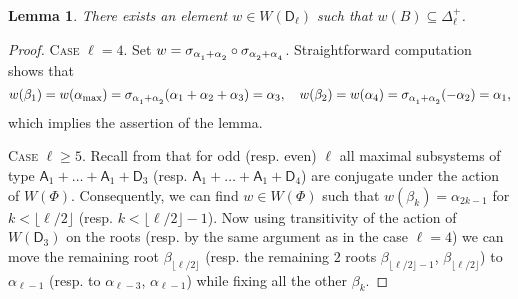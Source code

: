 \documentclass[oneside, 12pt]{amsart}
\theoremstyle{plain}
\numberwithin{equation}{section}
\newtheorem{lemma}{Lemma}
\numberwithin{lemma}{section}
\theoremstyle{definition}
\theoremstyle{remark}
\newcommand{\rA}{\mathsf{A}}
\newcommand{\rD}{\mathsf{D}}
\def\ssub#1{\mathchoice
   {_{\lower2pt\hbox{$\scriptstyle #1$}}}
   {_{\lower2pt\hbox{$\scriptstyle #1$}}}
   {_{\lower1.5pt\hbox{$\scriptscriptstyle #1$}}}
   {_{\!\lower1.5pt\hbox{$\scriptscriptstyle #1$}}}}
\begin{document}
\begin{lemma}\label{lemma:nikolov-weyl} There exists an element $w\in W(\rD_\ell)$ such that $w(B) \subseteq \Delta_\ell^+$. \end{lemma}
\begin{proof}
\textsc{Case $\ell=4$.} Set $w = \sigma_{\alpha\ssub{1} + \alpha\ssub{2}} \circ \sigma_{\alpha\ssub{2} + \alpha\ssub{4}}$.
Straightforward computation shows that 
\[ w(\beta_1) = w(\alpha_\mathrm{max}) = \sigma_{\alpha\ssub{1} + \alpha\ssub{2}}(\alpha_1 + \alpha_2 + \alpha_3) = \alpha_3, \quad w(\beta_2) = w(\alpha_4) = \sigma_{\alpha\ssub{1} + \alpha\ssub{2}}(- \alpha_2) = \alpha_1, \]
which implies the assertion of the lemma.

\textsc{Case $\ell \geq 5$.}
Recall from \cite[Table~9]{Dy72} that for odd (resp. even) $\ell$ all maximal subsystems of type $\rA_1+\ldots+\rA_1+\rD_3$
(resp. $\rA_1+\ldots+\rA_1+\rD_4$) are conjugate under the action of $W(\Phi)$. Consequently, we can find $w\in W(\Phi)$
such that $w(\beta_k) = \alpha_{2k-1}$ for $k < \lfloor\ell/2\rfloor$ (resp. $k < \lfloor\ell/2\rfloor-1$). 
Now using transitivity of the action of $W(\rD_3)$ on the roots (resp. by the same argument as in the case $\ell=4$) we can move the remaining root $\beta_{\lfloor\ell/2\rfloor}$ 
(resp. the remaining $2$ roots $\beta_{\lfloor\ell/2\rfloor-1}$, $\beta_{\lfloor\ell/2\rfloor}$) to
$\alpha_{\ell-1}$ (resp. to $\alpha_{\ell-3}$, $\alpha_{\ell-1}$) while fixing all the other $\beta_k$. \end{proof}
\end{document}
